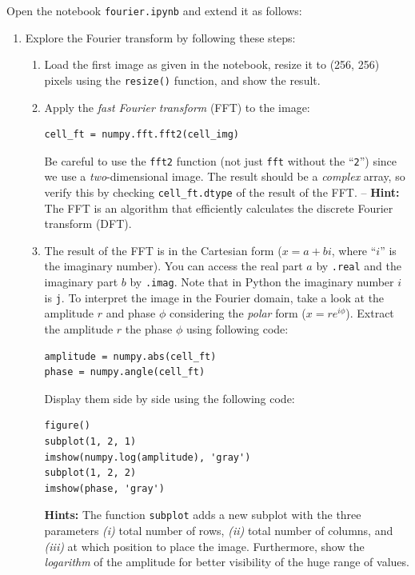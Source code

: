 \documentclass[12pt,a4paper]{article}
\begin{document}

\noindent
Open the notebook \texttt{fourier.ipynb} and extend it as follows:

\begin{enumerate}
\item Explore the Fourier transform by following these steps:
\begin{enumerate}
    \item Load the first image as given in the notebook, resize it to (256, 256) pixels using the \texttt{resize()} function, and show the result.
    \item Apply the \emph{fast Fourier transform} (FFT) to the image:
    \begin{Verbatim}[frame=single]
cell_ft = numpy.fft.fft2(cell_img)
    \end{Verbatim}
    Be careful to use the \texttt{fft2} function (not just \texttt{fft} without the ``\texttt{2}'') since we use a \emph{two}-dimensional image. The result should be a \emph{complex} array, so verify this by checking \texttt{cell\_ft.dtype} of the result of the FFT. -- \textbf{Hint:} The FFT is an algorithm that efficiently calculates the discrete Fourier transform (DFT).
    \item The result of the FFT is in the Cartesian form ($x = a + bi$, where ``$i$'' is the imaginary number). You can access the real part $a$ by \texttt{.real} and the imaginary part $b$ by \texttt{.imag}. Note that in Python the imaginary number $i$ is \texttt{j}. To interpret the image in the Fourier domain, take a look at the amplitude $r$ and phase $\phi$ considering the \emph{polar} form ($x = re^{i\phi}$). Extract the amplitude $r$ the phase $\phi$ using following code:
    \begin{Verbatim}[frame=single]
amplitude = numpy.abs(cell_ft)
phase = numpy.angle(cell_ft)
    \end{Verbatim}
    Display them side by side using the following code:
    \begin{Verbatim}[frame=single]
figure()
subplot(1, 2, 1)
imshow(numpy.log(amplitude), 'gray')
subplot(1, 2, 2)
imshow(phase, 'gray')
    \end{Verbatim}
    \textbf{Hints:} The function \texttt{subplot} adds a new subplot with the three parameters \textit{(i)} total number of rows, \textit{(ii)} total number of columns, and \textit{(iii)} at which position to place the image. Furthermore, show the \emph{logarithm} of the amplitude for better visibility of the huge range of values.

\end{enumerate}
\end{enumerate}
\end{document}
